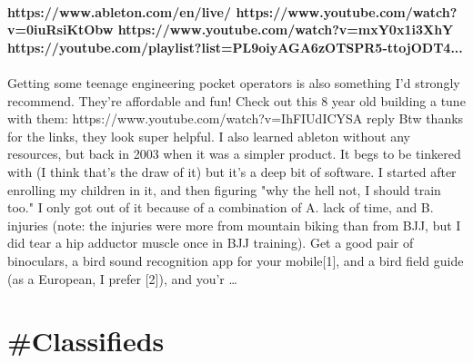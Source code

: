 \documentclass[10pt,a4paper]{article}
\begin{document}
\begin{multicols}{2}
\paragraph{}
\textbf{https://www.ableton.com/en/live/
https://www.youtube.com/watch?v=0iuRsiKtObw
https://www.youtube.com/watch?v=mxY0x1i3XhY
https://youtube.com/playlist?list=PL9oiyAGA6zOTSPR5-ttojODT4...}
\paragraph{}

Getting some teenage engineering pocket operators is also something I'd strongly recommend. They're affordable and fun!
Check out this 8 year old building a tune with them: https://www.youtube.com/watch?v=IhFIUdICYSA
reply
Btw thanks for the links, they look super helpful.
I also learned ableton without any resources, but back in 2003 when it was a simpler product. It begs to be tinkered with (I think that’s the draw of it) but it’s a deep bit of software.
I started after enrolling my children in it, and then figuring "why the hell not, I should train too."
I only got out of it because of a combination of A. lack of time, and B. injuries (note: the injuries were more from mountain biking than from BJJ, but I did tear a hip adductor muscle once in BJJ training).
Get a good pair of binoculars, a bird sound recognition app for your mobile[1], and a bird field guide (as a European, I prefer [2]), and you'r
\dots\par
\end{multicols}

\newpage
\section{\#Classifieds}
\end{document}
